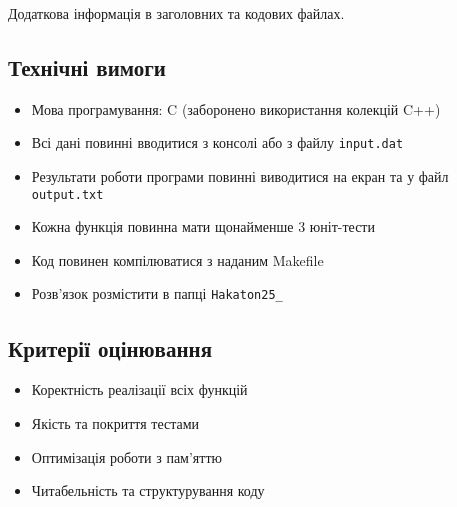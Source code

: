 \documentclass[]{article}
\begin{document}
\begin{enumerate}
Додаткова інформація в заголовних та кодових файлах.

\subsection*{Технічні вимоги}

\begin{itemize}
\item Мова програмування: C (заборонено використання колекцій C++)
\item Всі дані повинні вводитися з консолі або з файлу \texttt{input.dat}
\item Результати роботи програми повинні виводитися на екран та у файл \texttt{output.txt}
\item Кожна функція повинна мати щонайменше 3 юніт-тести
\item Код повинен компілюватися з наданим Makefile
\item Розв'язок розмістити в папці \texttt{Hakaton25\_<номер команди>}
\end{itemize}

\subsection*{Критерії оцінювання}

\begin{itemize}
\item Коректність реалізації всіх функцій 
\item Якість та покриття тестами 
\item Оптимізація роботи з пам'яттю 
\item Читабельність та структурування коду
\end{itemize}

\end{enumerate}
\end{document}
